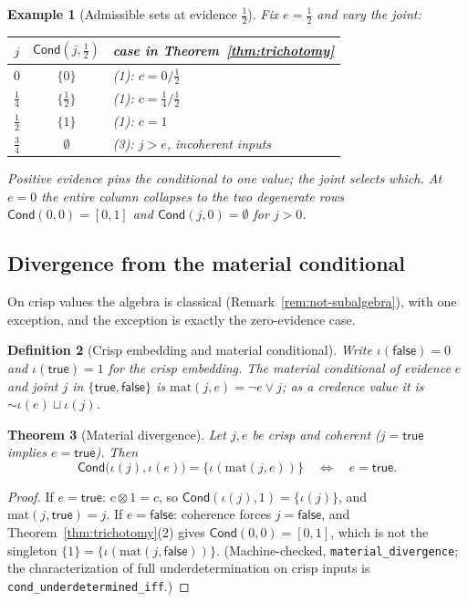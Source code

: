 \documentclass[11pt,a4paper]{article}
\newtheorem{theorem}{Theorem}[section]
\newtheorem{definition}[theorem]{Definition}
\newtheorem{example}[theorem]{Example}
\newcommand{\negc}{\mathord{\sim}}
\newcommand{\conjc}{\otimes}
\newcommand{\disjc}{\sqcup}
\newcommand{\Cond}{\mathsf{Cond}}
\begin{document}
\begin{example}[Admissible sets at evidence $\tfrac{1}{2}$]
\label{ex:cond-table}
Fix $e = \tfrac{1}{2}$ and vary the joint:
\begin{center}
\begin{tabular}{ccl}
\toprule
$j$ & $\Cond(j, \tfrac{1}{2})$ & case in
  Theorem~\ref{thm:trichotomy} \\
\midrule
$0$ & $\{0\}$ & (1): $c = 0/\tfrac{1}{2}$ \\
$\tfrac{1}{4}$ & $\{\tfrac{1}{2}\}$
  & (1): $c = \tfrac{1}{4}/\tfrac{1}{2}$ \\
$\tfrac{1}{2}$ & $\{1\}$ & (1): $c = 1$ \\
$\tfrac{3}{4}$ & $\emptyset$ & (3): $j > e$, incoherent inputs \\
\bottomrule
\end{tabular}
\end{center}
Positive evidence pins the conditional to one value; the joint
selects which.
At $e = 0$ the entire column collapses to the two degenerate rows
$\Cond(0,0) = [0,1]$ and $\Cond(j,0) = \emptyset$ for $j > 0$.
\end{example}

\subsection{Divergence from the material conditional}

On crisp values the algebra is classical
(Remark~\ref{rem:not-subalgebra}), with one exception, and the
exception is exactly the zero-evidence case.

\begin{definition}[Crisp embedding and material conditional]
\label{def:material}
Write $\iota(\mathsf{false}) = 0$ and $\iota(\mathsf{true}) = 1$ for
the crisp embedding.
The \emph{material conditional} of evidence $e$ and joint $j$ in
$\{\mathsf{true}, \mathsf{false}\}$ is
$\mathrm{mat}(j,e) = \lnot e \lor j$; as a credence value it is
$\negc \iota(e) \disjc \iota(j)$.
\end{definition}

\begin{theorem}[Material divergence]
\label{thm:material}
Let $j, e$ be crisp and coherent
($j = \mathsf{true}$ implies $e = \mathsf{true}$).
Then
\[
\Cond\bigl(\iota(j), \iota(e)\bigr)
  = \{\iota(\mathrm{mat}(j,e))\}
\quad\iff\quad
e = \mathsf{true}.
\]
\end{theorem}

\begin{proof}
If $e = \mathsf{true}$: $c \conjc 1 = c$, so
$\Cond(\iota(j), 1) = \{\iota(j)\}$, and
$\mathrm{mat}(j, \mathsf{true}) = j$.
If $e = \mathsf{false}$: coherence forces $j = \mathsf{false}$, and
Theorem~\ref{thm:trichotomy}(2) gives $\Cond(0,0) = [0,1]$, which is
not the singleton $\{1\} = \{\iota(\mathrm{mat}(j,\mathsf{false}))\}$.
(Machine-checked, \texttt{material\_divergence}; the
characterization of full underdetermination on crisp inputs is
\texttt{cond\_underdetermined\_iff}.)
\end{proof}
\end{document}
